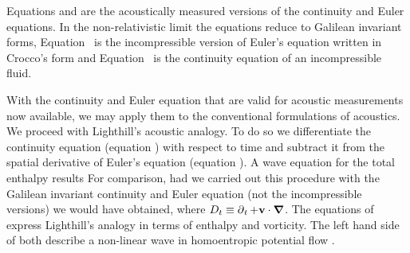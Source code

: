Equations  and  are the acoustically measured versions of the continuity and Euler equations.
In the non-relativistic limit the equations reduce to Galilean invariant forms, 
Equation~ is the incompressible version of Euler's equation written in Croc\-co's form\cite{Howe1998}
and Equation~ is the continuity equation of an incompressible fluid.

With  the  continuity and Euler equation that are valid for acoustic measurements now available,
we may  apply them to the  conventional formulations of acoustics.
We proceed with Lighthill's acoustic analogy\cite{Lighthill1952, Howe1998}.
To do so we   differentiate  the continuity equation (equation ) with respect to time 
and subtract it from the spatial derivative of  Euler's equation (equation ).
A wave equation for the  total enthalpy results
For comparison, 
had we carried out this procedure with the Galilean invariant continuity and Euler equation (not the incompressible versions) we would have obtained\cite{Howe1998},
where  $D_t \equiv \operatorname{\partial}_t + \textbf{v} \cdot \mbox{\boldmath $\nabla$}$.
The equations of  express  Lighthill's analogy in terms of enthalpy and vorticity\cite{Howe1998}.
The left hand side of both describe a non-linear wave in homoentropic potential flow \cite{Howe1998}.

